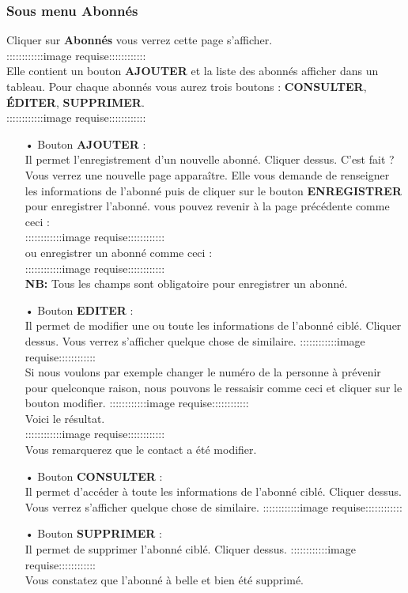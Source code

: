 \documentclass[12pt,a4paper]{article}
\begin{document}
\subsubsection{Sous menu \textbf{Abonnés}}
Cliquer sur \textbf{Abonnés} vous verrez cette page s'afficher.\\
::::::::::::image requise::::::::::::\\
Elle contient un bouton \textbf{AJOUTER} et la liste des abonnés afficher dans un tableau.
Pour chaque abonnés vous aurez trois boutons : \textbf{CONSULTER}, \textbf{ÉDITER}, 
\textbf{SUPPRIMER}.\\
::::::::::::image requise::::::::::::\\
\begin{itemize}
\item[•] Bouton \textbf{AJOUTER} : \\
Il permet l'enregistrement d'un nouvelle abonné. Cliquer dessus. C'est fait ? Vous verrez
une nouvelle page apparaître. Elle vous demande de renseigner les informations de l'abonné
puis de cliquer sur le bouton \textbf{ENREGISTRER} pour enregistrer l'abonné.
vous pouvez revenir à la page précédente comme ceci :\\
::::::::::::image requise::::::::::::\\
ou enregistrer un abonné comme ceci  :\\
::::::::::::image requise::::::::::::\\
\textbf{NB:} Tous les champs sont obligatoire pour enregistrer un abonné.
\item[•] Bouton \textbf{EDITER} : \\
Il permet de modifier une ou toute les informations de l'abonné ciblé. Cliquer dessus. Vous verrez s'afficher quelque chose de similaire.
::::::::::::image requise::::::::::::\\
Si nous voulons par exemple changer le numéro de la personne à prévenir pour quelconque 
raison, nous pouvons le ressaisir comme ceci et cliquer sur le bouton modifier.
::::::::::::image requise::::::::::::\\
Voici le résultat.\\
::::::::::::image requise::::::::::::\\
Vous remarquerez que le contact a été modifier.
\item[•] Bouton \textbf{CONSULTER} : \\
Il permet d'accéder à toute les informations de l'abonné ciblé. Cliquer dessus. Vous verrez
s'afficher quelque chose de similaire.
::::::::::::image requise::::::::::::\\
\item[•] Bouton \textbf{SUPPRIMER} : \\
Il permet de supprimer l'abonné ciblé. Cliquer dessus. 
::::::::::::image requise::::::::::::\\
Vous constatez que l'abonné à belle et bien été supprimé.
\end{itemize}
\end{document}
